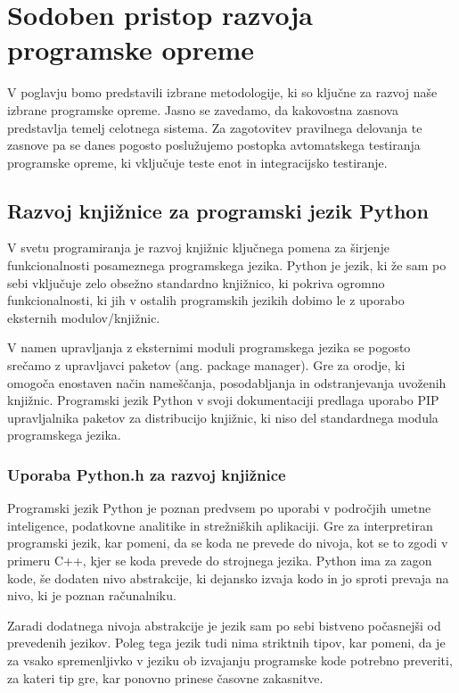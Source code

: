 \documentclass[a4paper,12pt,openright]{book}
\begin{document}
\chapter{Sodoben pristop razvoja programske opreme}
\label{ch1}

    V poglavju bomo predstavili izbrane metodologije, ki so ključne za razvoj naše izbrane programske opreme. Jasno se zavedamo, da kakovostna zasnova predstavlja temelj celotnega sistema. Za zagotovitev pravilnega delovanja te zasnove pa se danes pogosto poslužujemo postopka avtomatskega testiranja programske opreme, ki vključuje teste enot in integracijsko testiranje.

    \section{Razvoj knjižnice za programski jezik \newline Python}

    V svetu programiranja je razvoj knjižnic ključnega pomena za širjenje funkcionalnosti posameznega programskega jezika. Python je jezik, ki že sam po sebi vključuje zelo obsežno standardno knjižnico, ki pokriva ogromno funkcionalnosti, ki jih v ostalih programskih jezikih dobimo le z uporabo eksternih modulov/knjižnic.

    V namen upravljanja z eksternimi moduli programskega jezika se pogosto srečamo z upravljavci paketov (ang. package manager). Gre za orodje, ki omogoča enostaven način nameščanja, posodabljanja in odstranjevanja uvoženih knjižnic. Programski jezik Python v svoji dokumentaciji \cite{PY_PM} predlaga uporabo PIP upravljalnika paketov za distribucijo knjižnic, ki niso del standardnega modula programskega jezika.
   
    \subsection{Uporaba Python.h za razvoj knjižnice}
   Programski jezik Python je poznan predvsem po uporabi v področjih umetne inteligence, podatkovne analitike in strežniških aplikaciji. Gre za interpretiran programski jezik, kar pomeni, da se koda ne prevede do nivoja, kot se to zgodi v primeru C++, kjer se koda prevede do strojnega jezika. Python ima za zagon kode, še dodaten nivo abstrakcije, ki dejansko izvaja kodo in jo sproti prevaja na nivo, ki je poznan računalniku.

   Zaradi dodatnega nivoja abstrakcije je jezik sam po sebi bistveno počasnejši od prevedenih jezikov. Poleg tega jezik tudi nima striktnih tipov, kar pomeni, da je za vsako spremenljivko v jeziku ob izvajanju programske kode potrebno preveriti, za kateri tip gre, kar ponovno prinese časovne zakasnitve.
\end{document}
